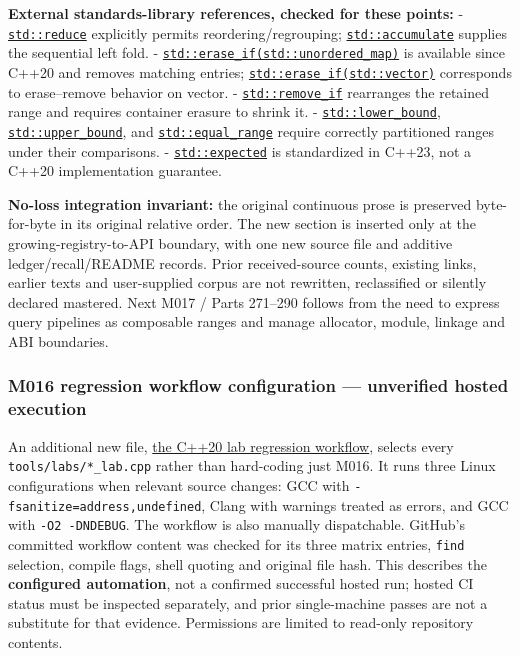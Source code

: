 \textbf{External standards-library references, checked for these points:} - \href{https://en.cppreference.com/cpp/algorithm/reduce}{\texttt{std::reduce}} explicitly permits reordering/regrouping; \href{https://en.cppreference.com/w/cpp/algorithm/accumulate}{\texttt{std::accumulate}} supplies the sequential left fold. - \href{https://en.cppreference.com/cpp/container/unordered_map/erase_if}{\texttt{std::erase\_if(std::unordered\_map)}} is available since C++20 and removes matching entries; \href{https://en.cppreference.com/cpp/container/vector/erase2}{\texttt{std::erase\_if(std::vector)}} corresponds to erase--remove behavior on vector. - \href{https://en.cppreference.com/w/cpp/algorithm/remove}{\texttt{std::remove\_if}} rearranges the retained range and requires container erasure to shrink it. - \href{https://en.cppreference.com/w/cpp/algorithm/lower_bound}{\texttt{std::lower\_bound}}, \href{https://en.cppreference.com/w/cpp/algorithm/upper_bound}{\texttt{std::upper\_bound}}, and \href{https://en.cppreference.com/w/cpp/algorithm/equal_range}{\texttt{std::equal\_range}} require correctly partitioned ranges under their comparisons. - \href{https://en.cppreference.com/w/cpp/utility/expected}{\texttt{std::expected}} is standardized in C++23, not a C++20 implementation guarantee.

\textbf{No-loss integration invariant:} the original continuous prose is preserved byte-for-byte in its original relative order. The new section is inserted only at the growing-registry-to-API boundary, with one new source file and additive ledger/recall/README records. Prior received-source counts, existing links, earlier texts and user-supplied corpus are not rewritten, reclassified or silently declared mastered. Next M017 / Parts 271--290 follows from the need to express query pipelines as composable ranges and manage allocator, module, linkage and ABI boundaries.

\subsubsection{M016 regression workflow configuration --- unverified hosted execution}\label{appendix-a103e7846d21-m016-regression-workflow-configuration-unverified-hosted-execution}

\hypertarget{appendix-a103e7846d21-m016-regression-workflow-configuration-unverified-hosted-execution}{}

An additional new file, \hyperref[source-file-3b1d957d4b185d11d5c207e1]{the C++20 lab regression workflow}, selects every \texttt{tools/labs/*\_lab.cpp} rather than hard-coding just M016. It runs three Linux configurations when relevant source changes: GCC with \texttt{-fsanitize=address,undefined}, Clang with warnings treated as errors, and GCC with \texttt{-O2\ -DNDEBUG}. The workflow is also manually dispatchable. GitHub's committed workflow content was checked for its three matrix entries, \texttt{find} selection, compile flags, shell quoting and original file hash. This describes the \textbf{configured automation}, not a confirmed successful hosted run; hosted CI status must be inspected separately, and prior single-machine passes are not a substitute for that evidence. Permissions are limited to read-only repository contents.

